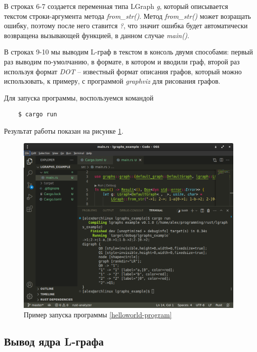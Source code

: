В строках 6-7 создается переменная типа LGraph \emph{g}, который описывается текстом строки-аргумента
метода \emph{from\_str()}. Метод \emph{from\_str()} может возращать ошибку, поэтому после него ставится \emph{?}, 
что значит ошибка будет автоматически возвращена вызывающей функцией, в данном случае \emph{main()}.

В строках 9-10 мы выводим L-граф в текстом в консоль двумя способами: первый раз выводим по-умолчанию,
в формате, в котором и вводили граф, второй раз используя формат \emph{DOT} -- известный формат описания графов,
который можно использовать, к примеру, с программой \emph{graphviz} для рисования графов. 

Для запуска программы, воспользуемся командой
\begin{verbatim}
    $ cargo run
\end{verbatim}
Результат работы показан на рисунке \ref{helloworld-out-image}.

\begin{figure}
    \centering
    \includegraphics[scale=0.4]{static_images/install_step5.png}
    \caption{Пример запуска программы \ref{helloworld-program}}
    \label{helloworld-out-image}
\end{figure}

\subsection{Вывод ядра L-графа}

\inputminted[linenos]{rust}{../lgraphs/examples/core11.rs} \label{core11-program}

